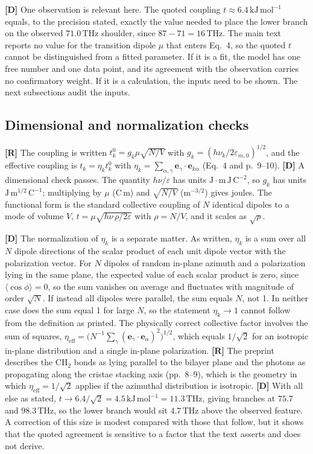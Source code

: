 \documentclass[11pt]{article}
\newcommand{\stR}{\textbf{\textcolor{blue!55!black}{[R]}}}
\newcommand{\stD}{\textbf{\textcolor{green!40!black}{[D]}}}
\newcommand{\thz}{\,\mathrm{THz}}
\newcommand{\kjm}{\,\mathrm{kJ\,mol^{-1}}}
\theoremstyle{plain}
\theoremstyle{definition}
\theoremstyle{remark}
\begin{document}
\stD{} One observation is relevant here. The quoted coupling $t\approx6.4\kjm$ equals, to the precision stated, exactly the value needed to place the lower branch on the observed $71.0\thz$ shoulder, since $87-71=16\thz$. The main text reports no value for the transition dipole $\mu$ that enters Eq.~4, so the quoted $t$ cannot be distinguished from a fitted parameter. If it is a fit, the model has one free number and one data point, and its agreement with the observation carries no confirmatory weight. If it is a calculation, the inputs need to be shown. The next subsections audit the inputs.

\subsection{Dimensional and normalization checks}

\stR{} The coupling is written $t^0_k=g_k\mu\sqrt{N/V}$ with $g_k=(h\nu_k/2\varepsilon_{m,0})^{1/2}$, and the effective coupling is $t_k=\eta_k t^0_k$ with $\eta_k=\sum_{\alpha,\gamma}\mathbf e_\gamma\cdot\mathbf e_{k\alpha}$ (Eq.~4 and p.~9--10). \stD{} A dimensional check passes. The quantity $h\nu/\varepsilon$ has units $\mathrm{J}\cdot\mathrm{m\,J\,C^{-2}}$, so $g_k$ has units $\mathrm{J\,m^{1/2}\,C^{-1}}$; multiplying by $\mu$ ($\mathrm{C\,m}$) and $\sqrt{N/V}$ ($\mathrm{m^{-3/2}}$) gives joules. The functional form is the standard collective coupling of $N$ identical dipoles to a mode of volume $V$, $t=\mu\sqrt{h\nu\,\rho/2\varepsilon}$ with $\rho=N/V$, and it scales as $\sqrt\rho$.

\stD{} The normalization of $\eta_k$ is a separate matter. As written, $\eta_k$ is a sum over all $N$ dipole directions of the scalar product of each unit dipole vector with the polarization vector. For $N$ dipoles of random in-plane azimuth and a polarization lying in the same plane, the expected value of each scalar product is zero, since $\langle\cos\phi\rangle=0$, so the sum vanishes on average and fluctuates with magnitude of order $\sqrt N$. If instead all dipoles were parallel, the sum equals $N$, not 1. In neither case does the sum equal 1 for large $N$, so the statement $\eta_k\to1$ cannot follow from the definition as printed. The physically correct collective factor involves the sum of squares, $\eta_{\mathrm{eff}}=\bigl(N^{-1}\sum_\gamma(\mathbf e_\gamma\cdot\mathbf e_\alpha)^2\bigr)^{1/2}$, which equals $1/\sqrt2$ for an isotropic in-plane distribution and a single in-plane polarization. \stR{} The preprint describes the CH$_2$ bonds as lying parallel to the bilayer plane and the photons as propagating along the cristae stacking axis (pp.~8--9), which is the geometry in which $\eta_{\mathrm{eff}}=1/\sqrt2$ applies if the azimuthal distribution is isotropic. \stD{} With all else as stated, $t\to6.4/\sqrt2=4.5\kjm=11.3\thz$, giving branches at $75.7$ and $98.3\thz$, so the lower branch would sit $4.7\thz$ above the observed feature. A correction of this size is modest compared with those that follow, but it shows that the quoted agreement is sensitive to a factor that the text asserts and does not derive.
\end{document}
